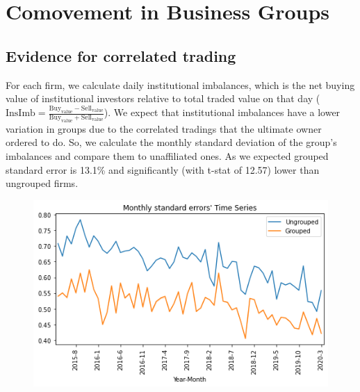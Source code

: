 \documentclass[12pt, a4paper]{article}
\begin{document}
\begin{table}[htbp]
	\centering
	\caption{\scriptsize}
	\label{Qmresult2subsanple}
	\resizebox{0.85\textwidth}{!}{
		
	}
\end{table}




\FloatBarrier
\section{Comovement in Business Groups}
\FloatBarrier

\subsection{Evidence for correlated trading }

 
For each firm, we calculate daily institutional imbalances, which is the net buying value of institutional investors relative to total traded value on that day ($ \text{InsImb} = \frac{\text{Buy}_{\text{value}} - \text{Sell}_{\text{value}}}{\text{Buy}_{\text{value}} + \text{Sell}_{\text{value}}} $). 
We expect that institutional imbalances have a lower variation in groups due to the correlated tradings that the ultimate owner ordered to do. So, we calculate the monthly standard deviation of the group's imbalances and compare them to unaffiliated ones. As we expected grouped standard error is  13.1\% and significantly (with t-stat of 12.57) lower than ungrouped firms. 

\begin{table}[htbp]
	\centering
	\resizebox{0.75\textwidth}{!}{
		
	}
	\label{tab:ImbalanceSummary}%
\end{table}%
\begin{figure}[htbp]
	\centering
	\includegraphics[width=0.8\linewidth]{GroupedSTD}
	\label{fig:GroupedSTD}
\end{figure}
\end{document}
